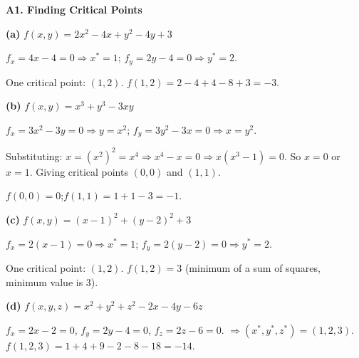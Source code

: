 \documentclass[12pt, a4paper]{article}
\theoremstyle{definition}
\begin{document}
\begin{solbox}
\textbf{A1. Finding Critical Points}

\textbf{(a)} $f(x,y) = 2x^2-4x+y^2-4y+3$

$f_x = 4x-4 = 0 \Rightarrow x^*=1$;\quad
$f_y = 2y-4 = 0 \Rightarrow y^*=2$.

One critical point: $(1, 2)$. $f(1,2)=2-4+4-8+3=-3$.

\medskip
\textbf{(b)} $f(x,y) = x^3+y^3-3xy$

$f_x = 3x^2-3y=0 \Rightarrow y=x^2$;\quad
$f_y = 3y^2-3x=0 \Rightarrow x=y^2$.

Substituting: $x = (x^2)^2 = x^4 \Rightarrow x^4-x=0 \Rightarrow x(x^3-1)=0$.
So $x=0$ or $x=1$. Giving critical points $(0,0)$ and $(1,1)$.

$f(0,0)=0$;\quad $f(1,1)=1+1-3=-1$.

\medskip
\textbf{(c)} $f(x,y) = (x-1)^2+(y-2)^2+3$

$f_x=2(x-1)=0 \Rightarrow x^*=1$;\quad
$f_y=2(y-2)=0 \Rightarrow y^*=2$.

One critical point: $(1,2)$. $f(1,2)=3$ (minimum of a sum of squares, minimum value is 3).

\medskip
\textbf{(d)} $f(x,y,z)=x^2+y^2+z^2-2x-4y-6z$

$f_x=2x-2=0$, $f_y=2y-4=0$, $f_z=2z-6=0$.
$\Rightarrow (x^*,y^*,z^*)=(1,2,3)$.
$f(1,2,3)=1+4+9-2-8-18=-14$.
\end{solbox}
\end{document}
